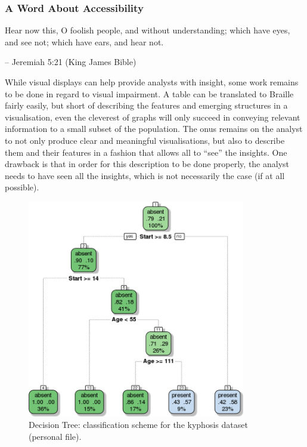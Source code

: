 \subsubsection{A Word About Accessibility}
\begin{tcolorbox}[title=Cubism's Missing Link]
Hear now this, O foolish people, and without understanding; which have eyes, and see not; which have ears, and hear not.\\[-0.6cm]
\begin{flushright}
-- Jeremiah 5:21 (King James Bible)
\end{flushright}
\end{tcolorbox}\noindent
While visual displays can help provide analysts with insight, some work remains to be done in regard to visual impairment. A table can be translated to Braille fairly easily, but short of describing the features and emerging structures in a visualisation, even the cleverest of graphs will only succeed in conveying relevant information to a small subset of the population. The onus remains on the analyst to not only produce clear and meaningful visualisations, but also to describe them and their features in a fashion that allows all to ``see'' the insights. One drawback is that in order for this description to be done properly, the analyst needs to have seen all the insights, which is not necessarily the case (if at all possible).
\newpage\noindent\vfill
\begin{figure}[H]
\centering
\includegraphics[width=0.85\textwidth]{images/DV/class_kyphosis_tree2.png}
\caption[\small Decision Tree: classification scheme for the kyphosis dataset ]{\small Decision Tree: classification scheme for the kyphosis dataset (personal file).} \label{fig:ex_dt_kyp}
\end{figure}
